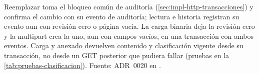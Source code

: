 Reemplazar toma el bloqueo común de auditoría (\cref{sec:impl-http-transacciones}) y confirma el cambio con su evento de auditoría; lectura e historia registran su evento aun con revisión cero o página vacía. La carga binaria deja la revisión cero y la multipart crea la uno, aun con campos vacíos, en una transacción con ambos eventos. Carga y anexado devuelven contenido y clasificación vigente desde su transacción, no desde un GET posterior que pudiera fallar (pruebas en la \cref{tab:pruebas-clasificacion}). Fuente: ADR~0020 en .






